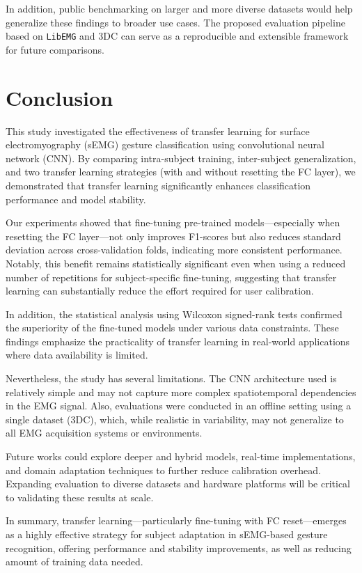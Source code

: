 \begin{multicols}{2}
In addition, public benchmarking on larger and more diverse datasets would help generalize these findings to broader use cases. The proposed evaluation pipeline based on \texttt{LibEMG} and 3DC can serve as a reproducible and extensible framework for future comparisons.

\section*{Conclusion}

This study investigated the effectiveness of transfer learning for surface electromyography (sEMG) gesture classification using convolutional neural network (CNN). By comparing intra-subject training, inter-subject generalization, and two transfer learning strategies (with and without resetting the FC layer), we demonstrated that transfer learning significantly enhances classification performance and model stability.

Our experiments showed that fine-tuning pre-trained models—especially when resetting the FC layer—not only improves F1-scores but also reduces standard deviation across cross-validation folds, indicating more consistent performance. Notably, this benefit remains statistically significant even when using a reduced number of repetitions for subject-specific fine-tuning, suggesting that transfer learning can substantially reduce the effort required for user calibration.

In addition, the statistical analysis using Wilcoxon signed-rank tests confirmed the superiority of the fine-tuned models under various data constraints. These findings emphasize the practicality of transfer learning in real-world applications where data availability is limited.

Nevertheless, the study has several limitations. The CNN architecture used is relatively simple and may not capture more complex spatiotemporal dependencies in the EMG signal. Also, evaluations were conducted in an offline setting using a single dataset (3DC), which, while realistic in variability, may not generalize to all EMG acquisition systems or environments.

Future works could explore deeper and hybrid models, real-time implementations, and domain adaptation techniques to further reduce calibration overhead. Expanding evaluation to diverse datasets and hardware platforms will be critical to validating these results at scale.

In summary, transfer learning—particularly fine-tuning with FC reset—emerges as a highly effective strategy for subject adaptation in sEMG-based gesture recognition, offering performance and stability improvements, as well as reducing amount of training data needed.


\end{multicols}
